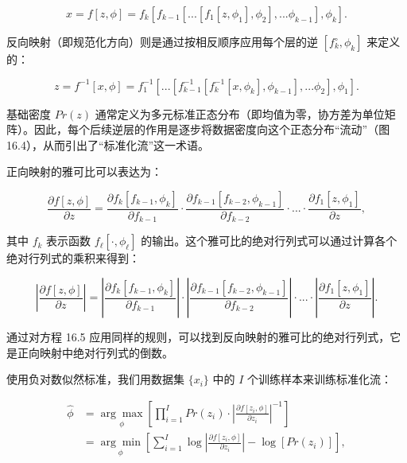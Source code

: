 \begin{equation}
x = f[z, \phi] = f_k \left[ f_{k-1} \left[ ... \left[ f_1[z, \phi_1], \phi_2 \right], ... \phi_{k-1} \right], \phi_k \right]. 
\end{equation}

反向映射（即规范化方向）则是通过按相反顺序应用每个层的逆 \([f_k^{\circ}, \phi_k]\) 来定义的：

\begin{equation}
z = f^{-1}[x, \phi] = f_1^{-1} \left[ ... \left[ f_{k-1}^{-1} \left[ f_k^{-1}[x, \phi_k], \phi_{k-1} \right], ... \phi_2 \right], \phi_1 \right]. 
\end{equation}

基础密度 \(Pr(z)\) 通常定义为多元标准正态分布（即均值为零，协方差为单位矩阵）。因此，每个后续逆层的作用是逐步将数据密度向这个正态分布“流动”（图 16.4），从而引出了“标准化流”这一术语。

正向映射的雅可比可以表达为：

\begin{equation}
\frac{\partial f[z, \phi]}{\partial z} = \frac{\partial f_k[f_{k-1}, \phi_k]}{\partial f_{k-1}} \cdot \frac{\partial f_{k-1}[f_{k-2}, \phi_{k-1}]}{\partial f_{k-2}} \cdot ... \cdot \frac{\partial f_1[z, \phi_1]}{\partial z}, 
\end{equation}

其中 \(f_k\) 表示函数 \(f_{\ell}[\cdot, \phi_{\ell}]\) 的输出。这个雅可比的绝对行列式可以通过计算各个绝对行列式的乘积来得到：

\begin{equation}
\left| \frac{\partial f[z, \phi]}{\partial z} \right| = \left| \frac{\partial f_k[f_{k-1}, \phi_k]}{\partial f_{k-1}} \right| \cdot \left| \frac{\partial f_{k-1}[f_{k-2}, \phi_{k-1}]}{\partial f_{k-2}} \right| \cdot ... \cdot \left| \frac{\partial f_1[z, \phi_1]}{\partial z} \right|. 
\end{equation}

通过对方程 16.5 应用同样的规则，可以找到反向映射的雅可比的绝对行列式，它是正向映射中绝对行列式的倒数。

使用负对数似然标准，我们用数据集 \(\{x_i\}\) 中的 \(I\) 个训练样本来训练标准化流：


\begin{align}
\hat{\phi} &= \underset{\phi}{\arg\max} \left[ \prod_{i=1}^I Pr(z_i) \cdot \left| \frac{\partial f[z_i, \phi]}{\partial z_i} \right|^{-1} \right] \\
&= \underset{\phi}{\arg\min} \left[ \sum_{i=1}^I \log \left| \frac{\partial f[z_i, \phi]}{\partial z_i} \right| - \log[Pr(z_i)] \right], 
\end{align} 


